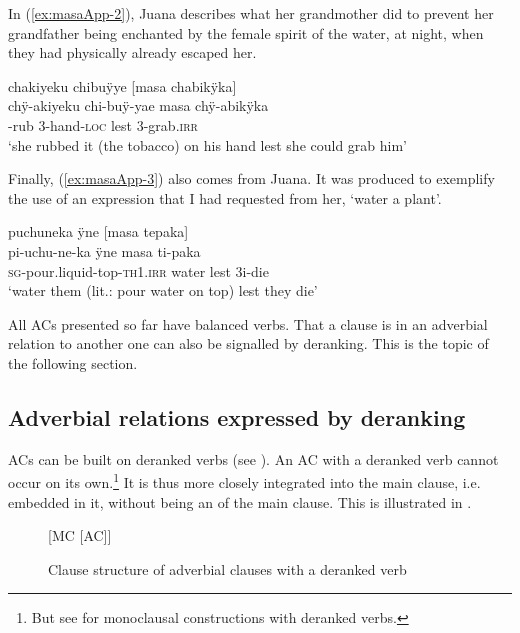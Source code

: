In (\ref{ex:masaApp-2}), Juana describes what her grandmother did to prevent her grandfather being enchanted by the female spirit of the water, at night, when they had physically already escaped her. 

\ea\label{ex:masaApp-2}
\begingl
\glpreamble chakiyeku chibuÿye \textup{[}masa chabikÿka\textup{]}\\
\gla chÿ-akiyeku chi-buÿ-yae masa chÿ-abikÿka\\
-rub 3-hand-\textsc{loc} lest 3-grab.\textsc{irr}\\
\glft ‘she rubbed it (the tobacco) on his hand lest she could grab him’
\endgl
\trailingcitation{[jxx-p151016l-2.207-208]}
\xe

Finally, (\ref{ex:masaApp-3}) also comes from Juana. It was produced to exemplify the use of an expression that I had requested from her, ‘water a plant’.

\ea\label{ex:masaApp-3}
\begingl
\glpreamble puchuneka ÿne \textup{[}masa tepaka\textup{]}\\
\gla pi-uchu-ne-ka ÿne masa ti-paka\\
\textsc{sg}-pour.liquid-top-\textsc{th}1.\textsc{irr} water lest 3i-die\\
\glft ‘water them (lit.: pour water on top) lest they die’
\endgl
\trailingcitation{[jxx-e151020l-1]}
\xe{}

All ACs presented so far have balanced verbs. That a clause is in an adverbial relation to another one can also be signalled by deranking. This is the topic of the following section.



\subsection{Adverbial relations expressed by deranking}\label{sec:SubordinateACs}

ACs can be built on deranked verbs (see ). An AC with a deranked verb cannot occur on its own.\footnote{But see  for monoclausal constructions with deranked verbs.} It is thus more closely integrated into the main clause, i.e. embedded in it, without being an  of the main clause. This is illustrated in .

\begin{figure}[!ht]


[MC [AC]]
\caption{Clause structure of adverbial clauses with a deranked verb}
\label{fig:DerankedACStructure}

\end{figure}

